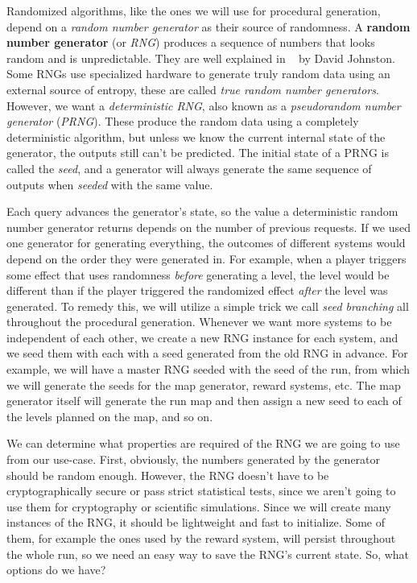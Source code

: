 Randomized algorithms, like the ones we will use for procedural generation, depend on a \emph{random number generator} as their source of randomness.
A \textbf{random number generator} (or \emph{RNG}) produces a sequence of numbers that looks random and is unpredictable.
They are well explained in ~\cite{johnston2018random} by David Johnston.
Some RNGs use specialized hardware to generate truly random data using an external source of entropy, these are called \emph{true random number generators}.
However, we want a \emph{deterministic RNG}, also known as a \emph{pseudorandom number generator} (\emph{PRNG}).
These produce the random data using a completely deterministic algorithm, but unless we know the current internal state of the generator, the outputs still can't be predicted.
The initial state of a PRNG is called the \emph{seed}, and a generator will always generate the same sequence of outputs when \emph{seeded} with the same value.

Each query advances the generator's state, so the value a deterministic random number generator returns depends on the number of previous requests.
If we used one generator for generating everything, the outcomes of different systems would depend on the order they were generated in.
For example, when a player triggers some effect that uses randomness \emph{before} generating a level, the level would be different than if the player triggered the randomized effect \emph{after} the level was generated.
To remedy this, we will utilize a simple trick we call \emph{seed branching} all throughout the procedural generation.
Whenever we want more systems to be independent of each other, we create a new RNG instance for each system, and we seed them with each with a seed generated from the old RNG in advance.
For example, we will have a master RNG seeded with the seed of the run, from which we will generate the seeds for the map generator, reward systems, etc.
The map generator itself will generate the run map and then assign a new seed to each of the levels planned on the map, and so on.

We can determine what properties are required of the RNG we are going to use from our use-case.
First, obviously, the numbers generated by the generator should be random enough.
However, the RNG doesn't have to be cryptographically secure or pass strict statistical tests, since we aren't going to use them for cryptography or scientific simulations.
Since we will create many instances of the RNG, it should be lightweight and fast to initialize.
Some of them, for example the ones used by the reward system, will persist throughout the whole run, so we need an easy way to save the RNG's current state.
So, what options do we have?

